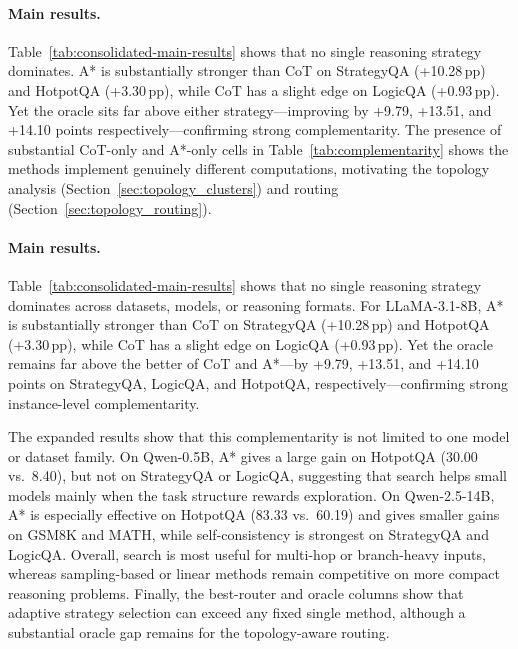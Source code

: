 \documentclass[11pt]{article}
\begin{document}
\paragraph{Main results.}
Table~\ref{tab:consolidated-main-results} shows that no single reasoning strategy dominates. A* is substantially stronger than CoT on StrategyQA (+10.28\,pp) and HotpotQA (+3.30\,pp), while CoT has a slight edge on LogicQA (+0.93\,pp). Yet the oracle sits far above either strategy---improving by +9.79, +13.51, and +14.10 points respectively---confirming strong complementarity. The presence of substantial CoT-only and A*-only cells in Table~\ref{tab:complementarity} shows the methods implement genuinely different computations, motivating the topology analysis (Section~\ref{sec:topology_clusters}) and routing (Section~\ref{sec:topology_routing}).



\paragraph{Main results.}
Table~\ref{tab:consolidated-main-results} shows that no single reasoning strategy dominates across datasets, models, or reasoning formats. For LLaMA-3.1-8B, A* is substantially stronger than CoT on StrategyQA (+10.28\,pp) and HotpotQA (+3.30\,pp), while CoT has a slight edge on LogicQA (+0.93\,pp). Yet the oracle remains far above the better of CoT and A*---by +9.79, +13.51, and +14.10 points on StrategyQA, LogicQA, and HotpotQA, respectively---confirming strong instance-level complementarity. 

The expanded results show that this complementarity is not limited to one model or dataset family. On Qwen-0.5B, A* gives a large gain on HotpotQA (30.00 vs.\ 8.40), but not on StrategyQA or LogicQA, suggesting that search helps small models mainly when the task structure rewards exploration. On Qwen-2.5-14B, A* is especially effective on HotpotQA (83.33 vs.\ 60.19) and gives smaller gains on GSM8K and MATH, while self-consistency is strongest on StrategyQA and LogicQA. Overall, search is most useful for multi-hop or branch-heavy inputs, whereas sampling-based or linear methods remain competitive on more compact reasoning problems. Finally, the best-router and oracle columns show that adaptive strategy selection can exceed any fixed single method, although a substantial oracle gap remains for the topology-aware routing.
\end{document}
